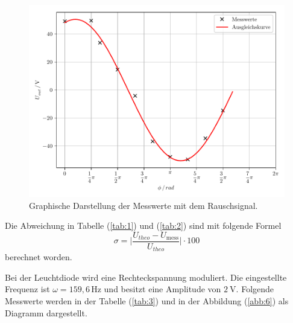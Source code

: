 \begin{figure}[H]
	\centering
	\includegraphics{plot5.pdf}
	\caption{Graphische Darstellung der Messwerte mit dem Rauschsignal.}
	\label{abb:8}
\end{figure}


Die Abweichung in Tabelle (\ref{tab:1}) und (\ref{tab:2}) sind mit folgende Formel
\begin{equation*}
  \sigma = \biggl| \frac{U_{theo}-U_\text{mess}}{U_{theo}} \biggl| \cdot 100
\end{equation*}
berechnet worden.

Bei der Leuchtdiode wird eine Rechteckspannung moduliert. Die eingestellte Frequenz ist $\omega = 159,6 \, \si{\hertz}$ und
besitzt eine Amplitude von $\SI{2}{\volt}$.
Folgende Messwerte werden in der Tabelle (\ref{tab:3}) und in der Abbildung (\ref{abb:6}) als
Diagramm dargestellt.

